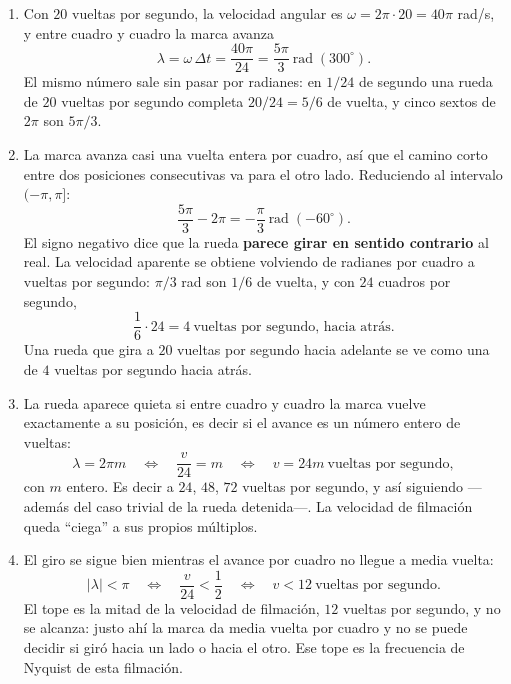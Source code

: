 \documentclass[10pt,a4paper]{article}
\begin{document}
	\begin{enumerate}
		\item Con $20$ vueltas por segundo, la velocidad angular es
		$\omega = 2\pi\cdot 20 = 40\pi$ rad/s, y entre cuadro y cuadro la marca avanza
		\[
			\lambda = \omega\,\Delta t = \frac{40\pi}{24} = \frac{5\pi}{3}\ \text{rad}
			\;(300^\circ).
		\]
		El mismo número sale sin pasar por radianes: en $1/24$ de segundo una rueda de $20$
		vueltas por segundo completa $20/24 = 5/6$ de vuelta, y cinco sextos de $2\pi$ son
		$5\pi/3$.

		\item La marca avanza casi una vuelta entera por
		cuadro, así que el camino corto entre dos posiciones consecutivas va para el otro lado.
		Reduciendo al intervalo $(-\pi,\pi]$:
		\[
			\frac{5\pi}{3} - 2\pi = -\frac{\pi}{3}\ \text{rad}\;(-60^\circ).
		\]
		El signo negativo dice que la rueda \textbf{parece girar en sentido contrario} al real.
		La velocidad aparente se obtiene volviendo de radianes por cuadro a vueltas por
		segundo: $\pi/3$ rad son $1/6$ de vuelta, y con $24$ cuadros por segundo,
		\[
			\frac{1}{6}\cdot 24 = 4\ \text{vueltas por segundo, hacia atrás}.
		\]
		Una rueda que gira a $20$ vueltas por segundo hacia adelante se ve como una de $4$
		vueltas por segundo hacia atrás.

		\item La rueda aparece quieta si entre cuadro y cuadro la
		marca vuelve exactamente a su posición, es decir si el avance es un número entero de
		vueltas:
		\[
			\lambda = 2\pi m
			\quad\Longleftrightarrow\quad
			\frac{v}{24} = m
			\quad\Longleftrightarrow\quad
			v = 24m \ \text{vueltas por segundo},
		\]
		con $m$ entero. Es decir a $24$, $48$, $72$ vueltas por segundo, y así siguiendo
		---además del caso trivial de la rueda detenida---. La velocidad de filmación queda
		``ciega'' a sus propios múltiplos.

		\item El giro se sigue bien mientras el avance
		por cuadro no llegue a media vuelta:
		\[
			|\lambda| < \pi
			\quad\Longleftrightarrow\quad
			\frac{v}{24} < \frac{1}{2}
			\quad\Longleftrightarrow\quad
			v < 12 \ \text{vueltas por segundo}.
		\]
		El tope es la mitad de la velocidad de filmación, $12$ vueltas por segundo, y no se
		alcanza: justo ahí la marca da media vuelta por cuadro y no se puede decidir si giró
		hacia un lado o hacia el otro. Ese tope es la frecuencia de Nyquist de esta filmación.
	\end{enumerate}
\end{document}
